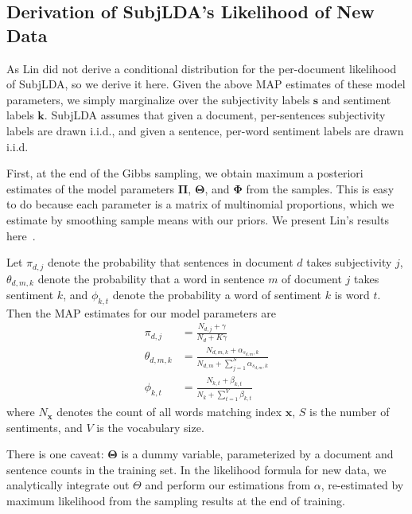 \documentclass{article}
\begin{document}
\subsection{Derivation of SubjLDA's Likelihood of New Data}
As Lin did not derive a conditional distribution for the per-document
likelihood of SubjLDA, so we derive it here. Given the above MAP
estimates of these model parameters, we simply marginalize over the
subjectivity labels $\mathbf{s}$ and sentiment labels $\mathbf{k}$.
SubjLDA assumes that given a document, per-sentences subjectivity
labels are drawn i.i.d., and given a sentence, per-word sentiment
labels are drawn i.i.d.

First, at the end of the Gibbs sampling, we obtain maximum a
posteriori estimates of the model parameters $\mathbf{\Pi}$,
$\mathbf{\Theta}$, and $\mathbf{\Phi}$ from the samples. This is
easy to do because each parameter is a matrix of multinomial
proportions, which we estimate by smoothing sample means with our
priors. We present Lin's results here~\citep{lin03}.

Let $\pi_{d,j}$ denote the probability that sentences in document
$d$ takes subjectivity $j$, $\theta_{d,m,k}$ denote the probability
that a word in sentence $m$ of document $j$ takes sentiment $k$,
and $\phi_{k,t}$ denote the probability a word of sentiment $k$ is
word $t$. Then the MAP estimates for our model parameters are
\begin{align}
\pi_{d,j}      &= \frac{N_{d,j} + \gamma}{N_d + K\gamma} \\
\theta_{d,m,k} &= \frac{N_{d,m,k} + \alpha_{s_{d,m},k}}{N_{d,m} + \sum_{j=1}^S \alpha_{s_{d,m},k}} \\
\phi_{k,t}     &= \frac{N_{k,t} + \beta_{k,t}}{N_k + \sum_{t=1}^V \beta_{k,t}}
\end{align}
where $N_{\mathbf{x}}$ denotes the count of all words matching
index $\mathbf{x}$, $S$ is the number of sentiments, and $V$ is the
vocabulary size.

There is one caveat: $\mathbf{\Theta}$ is a dummy variable,
parameterized by a document and sentence counts in the training
set. In the likelihood formula for new data, we analytically integrate
out $\Theta$ and perform our estimations from $\alpha$, re-estimated
by maximum likelihood from the sampling results at the end of training.
\end{document}
